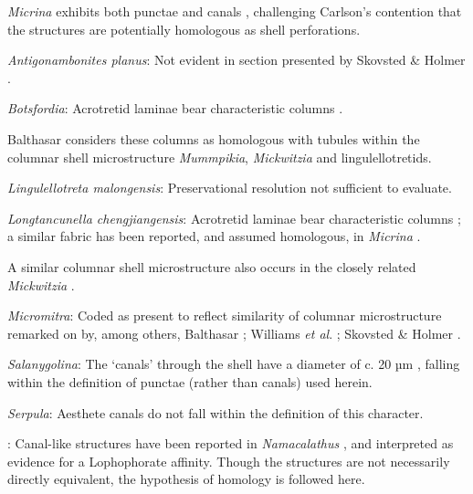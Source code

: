 \documentclass[openany]{book}
\theoremstyle{definition}
\theoremstyle{definition}
\theoremstyle{definition}
\theoremstyle{remark}
\begin{document}
\emph{Micrina} exhibits both punctae and canals
\citep{Harper2017Brachiopodsorigin}, challenging Carlson's contention
\citep[in][]{Williams2007Supplement} that the structures are potentially
homologous as shell perforations.

\hypertarget{Antigonambonites_planus-coding-129}{}
\emph{Antigonambonites planus}: Not evident in section presented by
Skovsted \& Holmer \citeyearpar{Skovsted2003EarlyCambrian}.

\hypertarget{Botsfordia-coding-129}{}
\emph{Botsfordia}: Acrotretid laminae bear characteristic columns
\citep[e.g.][]{Zhang2016Epithelialcell}.

Balthasar \citeyearpar{Balthasar2008iMummpikia} considers these columns
as homologous with tubules within the columnar shell microstructure
\emph{Mummpikia}, \emph{Mickwitzia} and lingulellotretids.

\hypertarget{Lingulellotreta_malongensis-coding-129}{}
\emph{Lingulellotreta malongensis}: Preservational resolution not
sufficient to evaluate.

\hypertarget{Longtancunella_chengjiangensis-coding-129}{}
\emph{Longtancunella chengjiangensis}: Acrotretid laminae bear
characteristic columns \citep[e.g.][]{Zhang2016Epithelialcell}; a
similar fabric has been reported, and assumed homologous, in
\emph{Micrina} \citep{Butler2012ConstructingCambrian}.

A similar columnar shell microstructure also occurs in the closely
related \emph{Mickwitzia} \citep{Balthasar2008iMummpikia}.

\hypertarget{Micromitra-coding-129}{}
\emph{Micromitra}: Coded as present to reflect similarity of columnar
microstructure remarked on by, among others, Balthasar
\citeyearpar{Balthasar2008iMummpikia}; Williams \emph{et al}.
\citeyearpar{Williams2007Supplement}; Skovsted \& Holmer
\citeyearpar{Skovsted2003EarlyCambrian}.

\hypertarget{Salanygolina-coding-129}{}
\emph{Salanygolina}: The `canals' through the shell have a diameter of
c. 20 µm \citep[text-fig. 2a]{Williams2004Chemicostructure}, falling
within the definition of punctae (rather than canals) used herein.

\hypertarget{Serpula-coding-129}{}
\emph{Serpula}: Aesthete canals do not fall within the definition of
this character.

\hypertarget{TAXLABELS-coding-129}{}
: Canal-like structures have been reported in \emph{Namacalathus}
\citep{Zhuravlev2015Ediacaranskeletal}, and interpreted as evidence for
a Lophophorate affinity. Though the structures are not necessarily
directly equivalent, the hypothesis of homology is followed here.
\end{document}
